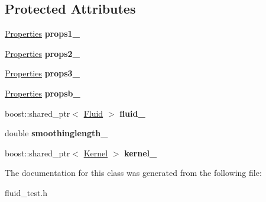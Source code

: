 \subsection*{\-Protected \-Attributes}
\begin{DoxyCompactItemize}
\item 
\hypertarget{classFluidTest_ad2d47a86c699e7e3486cb2812ebcd5dd}{\hyperlink{structProperties}{\-Properties} {\bfseries props1\-\_\-}}\label{classFluidTest_ad2d47a86c699e7e3486cb2812ebcd5dd}

\item 
\hypertarget{classFluidTest_ab250522b3bb2b8e3a55ffa1f0ea77ef3}{\hyperlink{structProperties}{\-Properties} {\bfseries props2\-\_\-}}\label{classFluidTest_ab250522b3bb2b8e3a55ffa1f0ea77ef3}

\item 
\hypertarget{classFluidTest_a251e4de7ff4c90c6c638faacca97888d}{\hyperlink{structProperties}{\-Properties} {\bfseries props3\-\_\-}}\label{classFluidTest_a251e4de7ff4c90c6c638faacca97888d}

\item 
\hypertarget{classFluidTest_afc77c8b2d5dc16e5603ea00d62bc4fa1}{\hyperlink{structProperties}{\-Properties} {\bfseries propsb\-\_\-}}\label{classFluidTest_afc77c8b2d5dc16e5603ea00d62bc4fa1}

\item 
\hypertarget{classFluidTest_af0e002deac7b4a45b094b452d50540fc}{boost\-::shared\-\_\-ptr$<$ \hyperlink{classFluid}{\-Fluid} $>$ {\bfseries fluid\-\_\-}}\label{classFluidTest_af0e002deac7b4a45b094b452d50540fc}

\item 
\hypertarget{classFluidTest_a6998b2cc704f21ca0935828b87db809e}{double {\bfseries smoothinglength\-\_\-}}\label{classFluidTest_a6998b2cc704f21ca0935828b87db809e}

\item 
\hypertarget{classFluidTest_aae91c7935522a40f11ca2d0edae1df7d}{boost\-::shared\-\_\-ptr$<$ \hyperlink{classKernel}{\-Kernel} $>$ {\bfseries kernel\-\_\-}}\label{classFluidTest_aae91c7935522a40f11ca2d0edae1df7d}

\end{DoxyCompactItemize}


\-The documentation for this class was generated from the following file\-:\begin{DoxyCompactItemize}
\item 
fluid\-\_\-test.\-h\end{DoxyCompactItemize}
